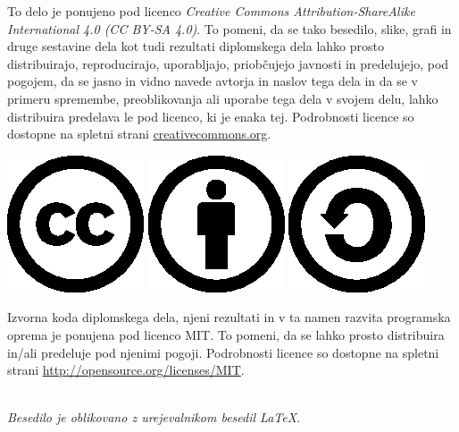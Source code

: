 \documentclass[a4paper,12pt,openany]{book}
\newcommand{\CcImageCc}[1]{%
	\includegraphics[scale=#1]{cc.eps}%
}
\newcommand{\CcImageBy}[1]{%
	\includegraphics[scale=#1]{by.eps}%
}
\newcommand{\CcImageSa}[1]{%
	\includegraphics[scale=#1]{sa.eps}%
}
\begin{document}
\thispagestyle{empty}

\vspace*{5cm}
{\small \noindent
To delo je ponujeno pod licenco \textit{Creative Commons Attribution-ShareAlike International 4.0 (CC BY-SA 4.0)}.
To pomeni, da se tako besedilo, slike, grafi in druge sestavine dela kot tudi rezultati diplomskega dela lahko prosto distribuirajo,
reproducirajo, uporabljajo, priobčujejo javnosti in predelujejo, pod pogojem, da se jasno in vidno navede avtorja in naslov tega
dela in da se v primeru spremembe, preoblikovanja ali uporabe tega dela v svojem delu, lahko distribuira predelava le pod
licenco, ki je enaka tej.
Podrobnosti licence so dostopne na spletni strani \href{http://creativecommons.org/licenses/by-sa/4.0/}{creativecommons.org}.

\begin{center}%
\CcImageCc{0.4}\hspace*{1ex}\CcImageBy{0.4}\hspace*{1ex}\CcImageSa{0.4}%
\end{center}
}

\vspace*{1.5cm}
{\small \noindent
Izvorna koda diplomskega dela, njeni rezultati in v ta namen razvita programska oprema je ponujena pod licenco MIT. To pomeni, da se lahko prosto distribuira in/ali predeluje pod njenimi pogoji.
Podrobnosti licence so dostopne na spletni strani \url{http://opensource.org/licenses/MIT}.
}

\begin{center} 
\ \\ \vfill
{\em
Besedilo je oblikovano z urejevalnikom besedil \LaTeX.}
\end{center}
\end{document}
